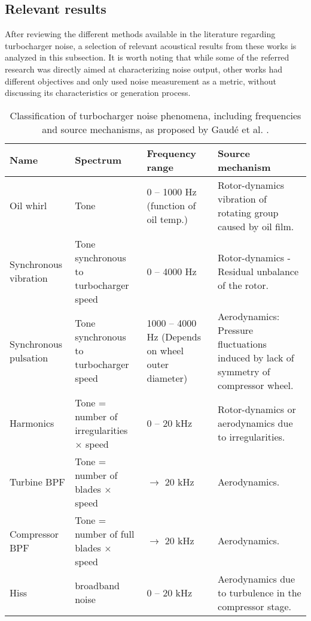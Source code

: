 \subsection{Relevant results}

After reviewing the different methods available in the literature regarding turbocharger noise, a selection of relevant acoustical results from these works is analyzed in this subsection. It is worth noting that while some of the referred research was directly aimed at characterizing noise output, other works had different objectives and only used noise measurement as a metric, without discussing its characteristics or generation process.

\begin{table}[b!]
  \centering
  \caption[Classification of turbocharger noise phenomena]{Classification of turbocharger noise phenomena, including frequencies and source mechanisms, as proposed by Gaudé et al. \cite{gaude2008experimental}.}
  \footnotesize
  \begin{adjustwidth}{-0.6cm}{}
    \begin{tabular}{p{2cm}p{3cm}p{2.5cm}p{4cm}}
    \toprule
    \textbf{Name} & \textbf{Spectrum} & \textbf{Frequency range} & \textbf{Source mechanism} \\
    \midrule
    Oil whirl & Tone  & 0 -- 1000 Hz
(function of oil temp.) & Rotor-dynamics vibration of rotating group caused by oil film. \\[2mm]
    Synchronous vibration & Tone synchronous to turbocharger speed & 0 -- 4000 Hz & Rotor-dynamics - Residual unbalance of  the rotor. \\[2mm]
    Synchronous pulsation & Tone synchronous to turbocharger speed & 1000 -- 4000 Hz (Depends on wheel outer diameter) & Aerodynamics: Pressure fluctuations induced by lack of symmetry of compressor wheel. \\[2mm]
    Harmonics & Tone = number of irregularities $\times$ speed & 0 -- 20 kHz & Rotor-dynamics or aerodynamics due to irregularities. \\[2mm]
    Turbine BPF & Tone = number of blades $\times$ speed & $\rightarrow$ 20 kHz & Aerodynamics. \\[2mm]
    Compressor BPF & Tone = number of full blades $\times$ speed & $\rightarrow$ 20 kHz & Aerodynamics. \\[2mm]
    Hiss  & broadband noise & 0 -- 20 kHz & Aerodynamics due to turbulence in the compressor stage. \\
    \bottomrule
    \end{tabular}
    \end{adjustwidth}
  \label{tab:lit_gaude_sources}
\end{table}

